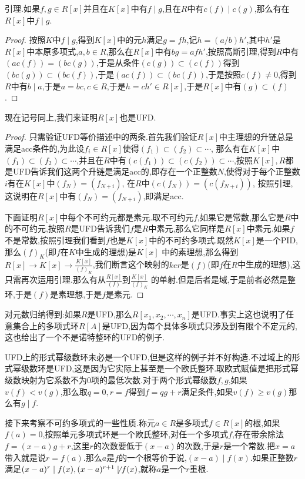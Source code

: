 引理.如果$f,g\in R[x]$并且在$K[x]$中有$f\mid g$,且在$R$中有$c(f)\mid c(g)$,那么有在$R[x]$中$f\mid g$.
\begin{proof}
	
	按照$K$中$f\mid g$,得到$K[x]$中的元$h$满足$g=fh$,记$h=(a/b)h'$,其中$h'$是$R[x]$中本原多项式,$a,b\in R$,那么在$R[x]$中有$bg=afh'$,按照高斯引理,得到$R$中有$(ac(f))=(bc(g))$,于是从条件$(c(g))\subset (c(f))$得到$(bc(g))\subset(bc(f))$,于是$(ac(f))\subset (bc(f))$,于是按照$c(f)\not=0$,得到$R$中有$b\mid a$,于是$a=bc,c\in R$,于是$h=ch'\in R[x]$,于是$R[x]$中有$(g)\subset(f)$.
\end{proof}

现在记号同上,我们来证明$R[x]$也是UFD.
\begin{proof}
	
	只需验证UFD等价描述中的两条.首先我们验证$R[x]$中主理想的升链总是满足acc条件的,为此设$f_i\in R[x]$使得$(f_1)\subset(f_2)\subset\cdots$, 那么有在$K[x]$中$(f_1)\subset (f_2)\subset\cdots$,并且在$R$中有$(c(f_1))\subset (c(f_2))\subset\cdots$,按照$K[x],R$都是UFD告诉我们这两个升链是满足acc的,即存在一个正整数$N$,使得对于每个正整数$i$有在$K[x]$中$(f_N)= (f_{N+i})$, 在$R$中$(c(f_N))=(c(f_{N+i}))$, 按照引理,这说明在$R[x]$中有$(f_N)=(f_{N+i})$,即满足acc.
	
	下面证明$R[x]$中每个不可约元都是素元.取不可约元$f$,如果它是常数,那么它是$R$中的不可约元,按照$R$是UFD告诉我们$f$是$R$中素元,那么它同样是$R[x]$中素元.如果$f$不是常数,按照引理我们看到$f$也是$K[x]$中的不可约多项式.既然$K[x]$是一个PID,那么$(f)_K$(即$f$在$K$中生成的理想)是$K[x]$ 中的素理想,那么得到$R[x]\to K[x]\to\frac{K[x]}{(f)_K}$,我们断言这个映射的$ker$是$(f)$(即$f$在$R$中生成的理想),这只需再次运用引理.那么有从$\frac{R[x]} {(f)}$到$\frac{K[x]}{(f)_K}$ 的单射.但是后者是域,于是前者必然是整环,于是$(f)$是素理想,于是$f$是素元.
\end{proof}

对元数归纳得到:如果$R$是UFD,那么$R[x_1,x_2,\cdots,x_n]$是UFD.事实上这也说明了任意集合上的多项式环$R[A]$是UFD,因为每个具体多项式只涉及到有限个不定元的,这也给出了一个不是诺特整环的UFD的例子.

UFD上的形式幂级数环未必是一个UFD,但是这样的例子并不好构造.不过域上的形式幂级数环是UFD,这是因为它实际上甚至是一个欧氏整环.取欧式赋值是把形式幂级数映射为它系数不为0项的最低次数.对于两个形式幂级数$f,g$,如果$v(f)<v(g)$,那么取$q=0,r=f$得到$f=qg+r$满足条件,如果$v(f)\ge v(g)$那么有$g\mid f$.

接下来考察不可约多项式的一些性质.称元$a\in R$是多项式$f\in R[x]$的根,如果$f(a)=0$,按照单元多项式环是一个欧氏整环,对任一个多项式$f$,存在带余除法$f=(x-a)g+r$,这里$r$的次数要低于$(x-a)$的次数,于是$r$是一个常数.把$x=a$带入就是说$r=f(a)$.那么$a$是$f$的一个根等价于说,$(x-a)\mid f(x)$.如果正整数$r$满足$(x-a)^r\mid f(x),(x-a)^{r+1}\not\mid f(x)$,就称$a$是一个$r$重根.

